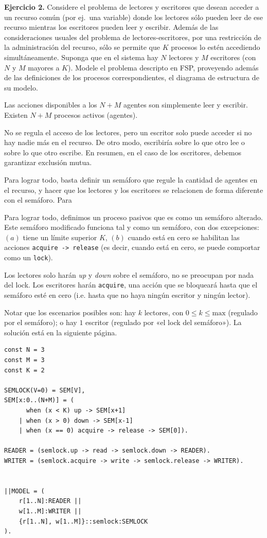 \documentclass[a4paper, 12pt]{article}
\begin{document}
\begin{myframe}
    \textbf{Ejercicio 2.} Considere el problema de lectores y escritores que desean acceder a un recurso común (por ej.\ una variable) donde los lectores sólo pueden leer de ese recurso mientras los escritores pueden leer y escribir. Además de las consideraciones usuales del problema de lectores-escritores, por una restricción de la administración del recurso, sólo se permite que $K$ procesos lo estén accediendo simultáneamente. Suponga que en el sistema hay $N$ lectores y $M$ escritores (con $N$ y $M$ mayores a $K$). Modele el problema descripto en FSP, proveyendo además de las definiciones de los procesos correspondientes, el diagrama de estructura de su modelo.
\end{myframe}

Las acciones disponibles a los $N + M$ agentes son simplemente leer y escribir. 
Existen $N + M$ procesos activos (agentes). 

No se regula el acceso de los lectores, pero un escritor solo puede acceder si
no hay nadie más en el recurso. De otro modo, escribiría sobre lo que otro lee o
sobre lo que otro escribe. En resumen, en el caso de los escritores, debemos
garantizar exclusión mutua. 

Para lograr todo, basta definir un semáforo que regule la cantidad de agentes en
el recurso, y hacer que los lectores y los escritores se relacionen de forma
diferente con el semáforo. Para 

Para lograr todo, definimos un proceso pasivos que es como un semáforo alterado.
Este semáforo modificado funciona tal y como un semáforo, con dos excepciones:
$(a)$ tiene un límite superior $K$, $(b)$ cuando está en cero se habilitan las
acciones \texttt{acquire -> release} (es decir,
cuando está en cero, se puede comportar como un \texttt{lock}).

Los lectores solo harán \textit{up} y \textit{down} sobre el semáforo, no se
preocupan por nada del lock. Los escritores harán \texttt{acquire}, una acción
que se bloqueará hasta que el semáforo esté en cero (i.e. hasta que no haya
ningún escritor y ningún lector).

Notar que los escenarios posibles son: hay $k$ lectores, con $0 \leq k \leq
\text{max}$ (regulado por el semáforo); o hay $1$ escritor (regulado por «el
lock del semáforo»). La solución está en la siguiente página.

\pagebreak
\begin{verbatim}
const N = 3
const M = 3
const K = 2

SEMLOCK(V=0) = SEM[V],
SEM[x:0..(N+M)] = (
	  when (x < K) up -> SEM[x+1]
	| when (x > 0) down -> SEM[x-1]
	| when (x == 0) acquire -> release -> SEM[0]).

READER = (semlock.up -> read -> semlock.down -> READER).
WRITER = (semlock.acquire -> write -> semlock.release -> WRITER).


||MODEL = (
	r[1..N]:READER || 
	w[1..M]:WRITER || 
	{r[1..N], w[1..M]}::semlock:SEMLOCK
).
\end{verbatim}
\end{document}
